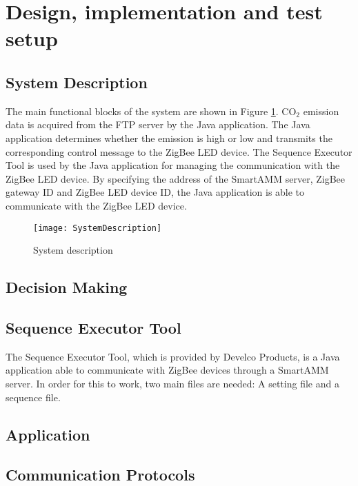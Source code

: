 \documentclass[Main]{subfiles}
\begin{document}
\section{Design, implementation and test setup} %
\label{sec:design_implementation_test_setup}

	\subsection{System Description}
		The main functional blocks of the system are shown in Figure \ref{fig:sysDesc}. 
		CO$_2$ emission data is acquired from the FTP server by the Java application. The Java application determines whether the emission is high or low and transmits the corresponding control message to the ZigBee LED device. 
		The Sequence Executor Tool is used by the Java application for managing the communication with the ZigBee LED device. 
		By specifying the address of the SmartAMM server, ZigBee gateway ID and ZigBee LED device ID, the Java application is able to communicate with the ZigBee LED device.  

		\begin{figure}[H]
		\centering
		\texttt{[image: SystemDescription]}
		\caption{System description}
		\label{fig:sysDesc}
		\end{figure}




	\subsection{Decision Making}



	\subsection{Sequence Executor Tool}
		The Sequence Executor Tool, which is provided by Develco Products, is a Java application able to communicate with ZigBee devices through a SmartAMM server.
		In order for this to work, two main files are needed: A setting file and a sequence file.
		


	\subsection{Application}



	\subsection{Communication Protocols}



\end{document}
